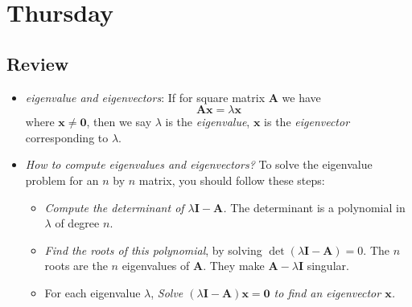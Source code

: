 
\section{Thursday}
\subsection{Review}
\begin{itemize}
\item
\emph{eigenvalue and eigenvectors}:
If for square matrix $\bm A$ we have
\[
\bm{Ax}=\lambda\bm x
\]
where $\bm x\ne\bm 0$, then we say $\lambda$ is the \textit{eigenvalue}, $\bm x$ is the \textit{eigenvector} corresponding to $\lambda$.
\item
\emph{How to compute eigenvalues and eigenvectors?}
To solve the eigenvalue problem for an $n$ by $n$ matrix, you should follow these steps:
\begin{itemize}
\item
\textit{Compute the determinant of $\lambda\bm I-\bm A$.} The determinant is a polynomial in $\lambda$ of degree $n$.
\item
\textit{Find the roots of this polynomial}, by solving $\det(\lambda\bm I-\bm A)=0$. The $n$ roots are the $n$ eigenvalues of $\bm A$. They make $\bm A-\lambda\bm I$ singular.
\item
For each eigenvalue $\lambda$, \textit{Solve $(\lambda\bm I-\bm A)\bm x=\bm 0$ to find an eigenvector $\bm x$.}
\end{itemize}
\end{itemize}
